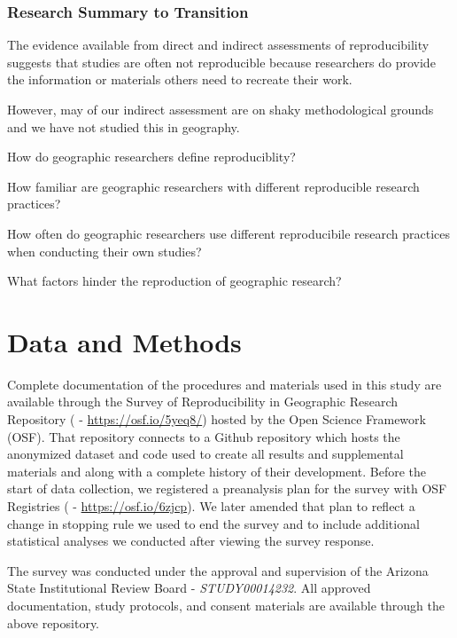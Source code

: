 \documentclass[]{interact}
\theoremstyle{plain}%
\theoremstyle{definition}
\theoremstyle{remark}
\begin{document}
\subsubsection*{Research Summary to Transition}
The evidence available from direct and indirect assessments of reproducibility suggests that studies are often not reproducible because researchers do provide the information or materials others need to recreate their work. 



However, may of our indirect assessment are on shaky methodological grounds and we have not studied this in geography. 

\begin{description}
\setlength{\itemindent}{0ex}
    \item[\textbf{(Q1)}] How do geographic researchers define reproduciblity?
    \item[\textbf{(Q2)}] How familiar are geographic researchers with different reproducible research practices?
    \item[\textbf{(Q3)}] How often do geographic researchers use different reproducibile research practices when conducting their own studies? 
    \item[\textbf{(Q4)}] What factors hinder the reproduction of geographic research?
\end{description}


\section*{Data and Methods}
Complete documentation of the procedures and materials used in this study are available through the Survey of Reproducibility in Geographic Research Repository (\citet{Kedron_Holler_Bardin_Hilgendorf_2022} - \url{https://osf.io/5yeq8/}) hosted by the Open Science Framework (OSF).
That repository connects to a Github repository which hosts the anonymized dataset and code used to create all results and supplemental materials and along with a complete history of their development. 
Before the start of data collection, we registered a preanalysis plan for the survey with OSF Registries (\citet{Kedron_Survey_PAP} - \url{https://osf.io/6zjcp}). 
We later amended that plan to reflect a change in stopping rule we used to end the survey and to include additional statistical analyses we conducted after viewing the survey response. 

The survey was conducted under the approval and supervision of the Arizona State Institutional Review Board - \textit{STUDY00014232}.
All approved documentation, study protocols, and consent materials are available through the above repository.
\end{document}

